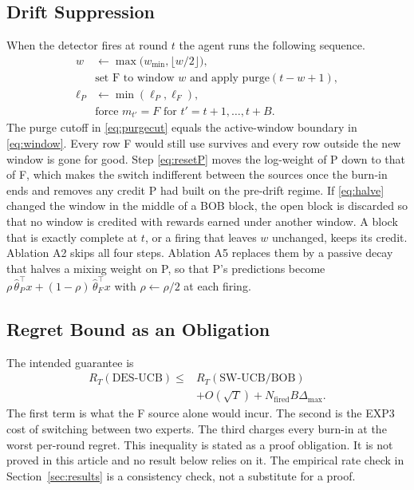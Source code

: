 \subsection{Drift Suppression}
When the detector fires at round $t$ the agent runs the following sequence.
\begin{align}
w&\leftarrow\max\big(w_{\min},\lfloor w/2\rfloor\big),\label{eq:halve}\\
&\text{set F to window } w \text{ and apply } \mathrm{purge}(t-w+1),\label{eq:purgecut}\\
\ell_P&\leftarrow\min(\ell_P,\ell_F),\label{eq:resetP}\\
&\text{force } m_{t'}=F \text{ for } t'=t+1,\dots,t+B.\label{eq:burnin}
\end{align}
The purge cutoff in \eqref{eq:purgecut} equals the active-window boundary in \eqref{eq:window}. Every row F would still use survives and every row outside the new window is gone for good. Step \eqref{eq:resetP} moves the log-weight of P down to that of F, which makes the switch indifferent between the sources once the burn-in ends and removes any credit P had built on the pre-drift regime. If \eqref{eq:halve} changed the window in the middle of a BOB block, the open block is discarded so that no window is credited with rewards earned under another window. A block that is exactly complete at $t$, or a firing that leaves $w$ unchanged, keeps its credit. Ablation A2 skips all four steps. Ablation A5 replaces them by a passive decay that halves a mixing weight on P, so that P's predictions become $\rho\,\hat\theta_P^\top x+(1-\rho)\,\hat\theta_F^\top x$ with $\rho\leftarrow\rho/2$ at each firing.

\subsection{Regret Bound as an Obligation}
The intended guarantee is
\begin{align}
R_T(\text{DES-UCB})\le{}& R_T(\text{SW-UCB/BOB})\nonumber\\
&+O(\sqrt T)+N_{\mathrm{fired}}B\Delta_{\max}.
\label{eq:bound}
\end{align}
The first term is what the F source alone would incur. The second is the EXP3 cost of switching between two experts. The third charges every burn-in at the worst per-round regret. This inequality is stated as a proof obligation. It is not proved in this article and no result below relies on it. The empirical rate check in Section~\ref{sec:results} is a consistency check, not a substitute for a proof.

